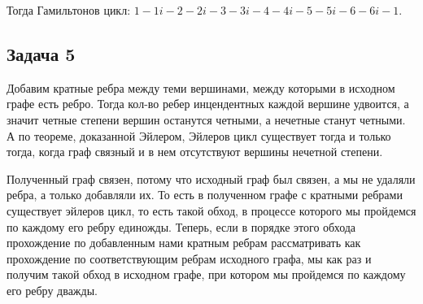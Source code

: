 	Тогда Гамильтонов цикл: $1 - 1i - 2 - 2i - 3 - 3i - 4 - 4i - 5 - 5i - 6 - 6i - 1$.
	
	\subsection{Задача 5}
	Добавим кратные ребра между теми вершинами, между которыми в исходном графе есть ребро. Тогда кол-во ребер инцендентных каждой вершине удвоится, а значит четные степени вершин останутся четными, а нечетные станут четными. А по теореме, доказанной Эйлером, Эйлеров цикл существует тогда и только тогда, когда граф связный и в нем отсутствуют вершины нечетной степени. 
	
	Полученный граф связен, потому что исходный граф был связен, а мы не удаляли ребра, а только добавляли их. То есть в полученном графе с кратными ребрами существует эйлеров цикл, то есть такой обход, в процессе которого мы пройдемся по каждому его ребру единожды. Теперь, если в порядке этого обхода прохождение по добавленным нами кратным ребрам рассматривать как прохождение по соответствующим ребрам исходного графа, мы как раз и получим такой обход в исходном графе, при котором мы пройдемся по каждому его ребру дважды. 
	
	
	
